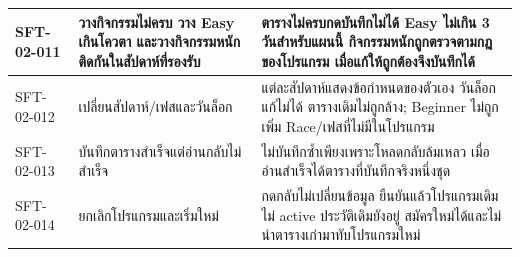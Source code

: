 \begin{longtable}{|>{\raggedright\arraybackslash}p{}|>{\raggedright\arraybackslash}p{}|>{\raggedright\arraybackslash}p{}|}
SFT-02-011 & วางกิจกรรมไม่ครบ วาง Easy เกินโควตา และวางกิจกรรมหนักติดกันในสัปดาห์ที่รองรับ & ตารางไม่ครบกดบันทึกไม่ได้ Easy ไม่เกิน 3 วันสำหรับแผนนี้ กิจกรรมหนักถูกตรวจตามกฎของโปรแกรม เมื่อแก้ให้ถูกต้องจึงบันทึกได้ \\ \hline
SFT-02-012 & เปลี่ยนสัปดาห์/เฟสและวันล็อก & แต่ละสัปดาห์แสดงข้อกำหนดของตัวเอง วันล็อกแก้ไม่ได้ ตารางเดิมไม่ถูกล้าง; Beginner ไม่ถูกเพิ่ม Race/เฟสที่ไม่มีในโปรแกรม \\ \hline
SFT-02-013 & บันทึกตารางสำเร็จแต่อ่านกลับไม่สำเร็จ & ไม่บันทึกซ้ำเพียงเพราะโหลดกลับล้มเหลว เมื่ออ่านสำเร็จได้ตารางที่บันทึกจริงหนึ่งชุด \\ \hline
SFT-02-014 & ยกเลิกโปรแกรมและเริ่มใหม่ & กดกลับไม่เปลี่ยนข้อมูล ยืนยันแล้วโปรแกรมเดิมไม่ active ประวัติเดิมยังอยู่ สมัครใหม่ได้และไม่นำตารางเก่ามาทับโปรแกรมใหม่ \\ \hline
\end{longtable}
\endgroup

